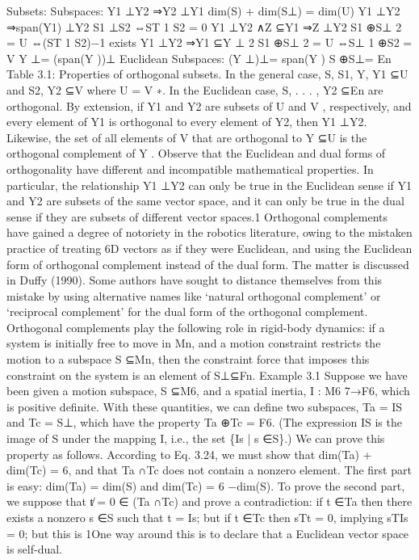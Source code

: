 Subsets: Subspaces: Y1 ⊥Y2 ⇒Y2 ⊥Y1 dim(S) + dim(S⊥) = dim(U) Y1 ⊥Y2 ⇒span(Y1) ⊥Y2 S1 ⊥S2 ⇔ST 1 S2 = 0 Y1 ⊥Y2 ∧Z ⊆Y1 ⇒Z ⊥Y2 S1 ⊕S⊥ 2 = U ⇔(ST 1 S2)−1 exists Y1 ⊥Y2 ⇒Y1 ⊆Y ⊥ 2 S1 ⊕S⊥ 2 = U ⇔S⊥ 1 ⊕S2 = V Y ⊥= (span(Y ))⊥ Euclidean Subspaces: (Y ⊥)⊥= span(Y ) S ⊕S⊥= En Table 3.1: Properties of orthogonal subsets. In the general case, S, S1, Y, Y1 ⊆U and S2, Y2 ⊆V where U = V ∗. In the Euclidean case, S, . . . , Y2 ⊆En are orthogonal. By extension, if Y1 and Y2 are subsets of U and V , respectively, and every element of Y1 is orthogonal to every element of Y2, then Y1 ⊥Y2. Likewise, the set of all elements of V that are orthogonal to Y ⊆U is the orthogonal complement of Y . Observe that the Euclidean and dual forms of orthogonality have different and incompatible mathematical properties. In particular, the relationship Y1 ⊥Y2 can only be true in the Euclidean sense if Y1 and Y2 are subsets of the same vector space, and it can only be true in the dual sense if they are subsets of different vector spaces.1 Orthogonal complements have gained a degree of notoriety in the robotics literature, owing to the mistaken practice of treating 6D vectors as if they were Euclidean, and using the Euclidean form of orthogonal complement instead of the dual form. The matter is discussed in Duffy (1990). Some authors have sought to distance themselves from this mistake by using alternative names like ‘natural orthogonal complement’ or ‘reciprocal complement’ for the dual form of the orthogonal complement. Orthogonal complements play the following role in rigid-body dynamics: if a system is initially free to move in Mn, and a motion constraint restricts the motion to a subspace S ⊆Mn, then the constraint force that imposes this constraint on the system is an element of S⊥⊆Fn. Example 3.1 Suppose we have been given a motion subspace, S ⊆M6, and a spatial inertia, I : M6 7→F6, which is positive definite. With these quantities, we can define two subspaces, Ta = IS and Tc = S⊥, which have the property Ta ⊕Tc = F6. (The expression IS is the image of S under the mapping I, i.e., the set \{Is | s ∈S\}.) We can prove this property as follows. According to Eq. 3.24, we must show that dim(Ta) + dim(Tc) = 6, and that Ta ∩Tc does not contain a nonzero element. The first part is easy: dim(Ta) = dim(S) and dim(Tc) = 6 −dim(S). To prove the second part, we suppose that t̸ = 0 ∈ (Ta ∩Tc) and prove a contradiction: if t ∈Ta then there exists a nonzero s ∈S such that t = Is; but if t ∈Tc then sTt = 0, implying sTIs = 0; but this is 1One way around this is to declare that a Euclidean vector space is self-dual.

